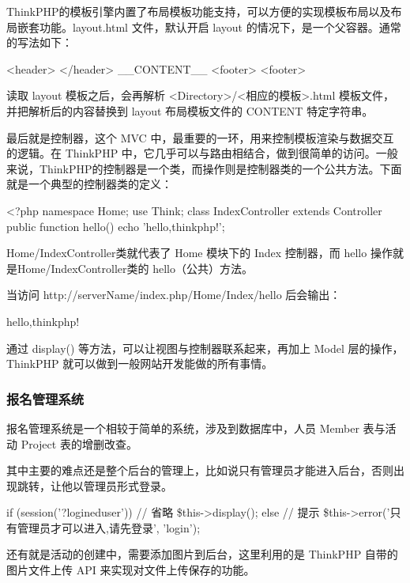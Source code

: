 ThinkPHP的模板引擎内置了布局模板功能支持，可以方便的实现模板布局以及布局嵌套功能。layout.html 文件，默认开启 layout 的情况下，是一个父容器。通常的写法如下：

\begin{code}
<header>
</header>
  {__CONTENT__}
<footer>
<footer>
\end{code}

读取 layout 模板之后，会再解析 <Directory>/<相应的模板>.html 模板文件，并把解析后的内容替换到 layout 布局模板文件的 {CONTENT} 特定字符串。

最后就是控制器，这个 MVC 中，最重要的一环，用来控制模板渲染与数据交互的逻辑。在 ThinkPHP 中，它几乎可以与路由相结合，做到很简单的访问。一般来说，ThinkPHP的控制器是一个类，而操作则是控制器类的一个公共方法。下面就是一个典型的控制器类的定义：

\begin{code}
<?php
namespace Home\Controller;
use Think\Controller;
class IndexController extends Controller {
    public function hello(){
        echo 'hello,thinkphp!';
    }
}
\end{code}

Home/IndexController类就代表了 Home 模块下的 Index 控制器，而 hello 操作就是Home/IndexController类的 hello（公共）方法。

当访问 http://serverName/index.php/Home/Index/hello 后会输出：

\begin{code}
hello,thinkphp!
\end{code}

通过 display() 等方法，可以让视图与控制器联系起来，再加上 Model 层的操作，ThinkPHP 就可以做到一般网站开发能做的所有事情。

\subsubsection{报名管理系统}

报名管理系统是一个相较于简单的系统，涉及到数据库中，人员 Member 表与活动 Project 表的增删改查。

其中主要的难点还是整个后台的管理上，比如说只有管理员才能进入后台，否则出现跳转，让他以管理员形式登录。

\begin{code}
if (session('?logineduser')) {
  // 省略
  \$this->display();
} else {
  // 提示
  \$this->error('只有管理员才可以进入,请先登录', 'login');
}
\end{code}

还有就是活动的创建中，需要添加图片到后台，这里利用的是 ThinkPHP 自带的图片文件上传 API 来实现对文件上传保存的功能。

